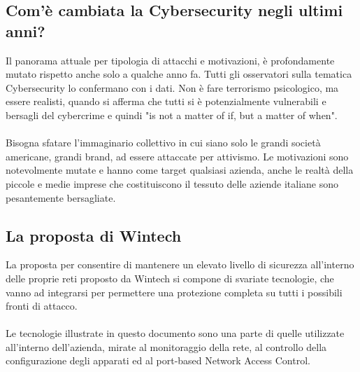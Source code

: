 \documentclass[Tesi.tex]{subfiles}
\begin{document}
\subsection{Com'è cambiata la Cybersecurity negli ultimi anni?}
Il panorama attuale per tipologia di attacchi e motivazioni, è profondamente mutato rispetto anche solo a qualche anno fa. Tutti gli osservatori sulla tematica Cybersecurity lo confermano con i dati. Non è fare terrorismo psicologico, ma essere realisti, quando si afferma che tutti si è potenzialmente vulnerabili e bersagli del cybercrime e quindi "is not a matter of if, but a matter of when".\\\\
Bisogna sfatare l'immaginario collettivo in cui siano solo le grandi società americane, grandi brand, ad essere attaccate per attivismo. Le motivazioni sono notevolmente mutate e hanno come target qualsiasi azienda, anche le realtà della piccole e medie imprese che costituiscono il tessuto delle aziende italiane sono pesantemente bersagliate.

\subsection{La proposta di Wintech}
La proposta per consentire di mantenere un elevato livello di sicurezza all'interno delle proprie reti proposto da Wintech si compone di svariate tecnologie, che vanno ad integrarsi per permettere una protezione completa su tutti i possibili fronti di attacco. \\\\
Le tecnologie illustrate in questo documento sono una parte di quelle utilizzate all'interno dell'azienda, mirate al monitoraggio della rete, al controllo della configurazione degli apparati ed al port-based Network Access Control.
\end{document}
